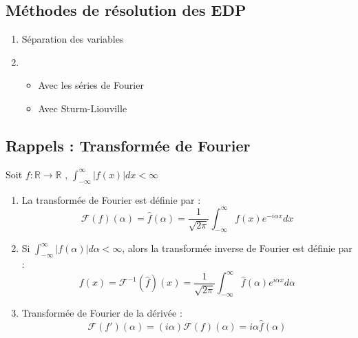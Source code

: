 \subsection{Méthodes de résolution des EDP}
\begin{enumerate}
    \item Séparation des variables
    \item \begin{itemize}
        \item Avec les séries de Fourier
        \item Avec Sturm-Liouville
    \end{itemize}
\end{enumerate}

\subsection{Rappels : Transformée de Fourier}
Soit $f : \mathbb{R} \to \mathbb{R}$ , $\int_{-\infty}^{\infty} |f(x)|dx < \infty$
\begin{enumerate}
    \item La transformée de Fourier est définie par : 
    $$\mathcal{F}(f)(\alpha) = \widehat{f}(\alpha) = \frac{1}{\sqrt{2\pi}} \int_{-\infty}^{\infty} f(x) e^{-i\alpha x} dx$$
    \item Si $\int_{-\infty}^{\infty} |f(\alpha)| d\alpha < \infty$, alors la transformée inverse de Fourier est définie par :
    $$f(x) = \mathcal{F}^{-1}(\widehat{f})(x) = \frac{1}{\sqrt{2\pi}} \int_{-\infty}^{\infty} \widehat{f}(\alpha) e^{i\alpha x} d\alpha$$
    \item Transformée de Fourier de la dérivée :
    $$\mathcal{F}(f')(\alpha) = (i\alpha) \mathcal{F}(f)(\alpha) = i\alpha \widehat{f}(\alpha)$$
\end{enumerate}


